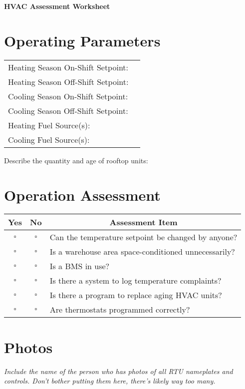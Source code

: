 \documentclass[./main.tex]{subfiles}
\begin{document}
\begin{center}
\Large\textbf{HVAC Assessment Worksheet}
\end{center}

\section*{Operating Parameters}
\noindent\begin{tabularx}{\textwidth}{@{}lX@{}}
Heating Season On-Shift Setpoint:  & \hrulefill \\[2ex]
Heating Season Off-Shift Setpoint: & \hrulefill \\[2ex]
Cooling Season On-Shift Setpoint:  & \hrulefill \\[2ex]
Cooling Season Off-Shift Setpoint: & \hrulefill \\[2ex]
Heating Fuel Source(s): & \hrulefill \\[2ex]
Cooling Fuel Source(s): & \hrulefill \\[2ex]
\end{tabularx}

\noindent Describe the quantity and age of rooftop units:  \vspace{\answerspace}

\section*{Operation Assessment}

\begin{tabular}{|c|c|p{14cm}|}
\hline
\multicolumn{1}{|c|}{\textbf{Yes}} & \multicolumn{1}{c|}{\textbf{No}} & \multicolumn{1}{c|}{\textbf{Assessment Item}} \\
\hline
$\square$ & $\square$ & Can the temperature setpoint be changed by anyone?  \\
\hline
$\square$ & $\square$ & Is a warehouse area space-conditioned unnecessarily?  \\
\hline
$\square$ & $\square$ & Is a BMS in use?  \\
\hline
$\square$ & $\square$ & Is there a system to log temperature complaints?  \\
\hline
$\square$ & $\square$ & Is there a program to replace aging HVAC units?  \\
\hline
$\square$ & $\square$ & Are thermostats programmed correctly?  \\
\hline
\end{tabular}

\section*{Photos}
\emph{Include the name of the person who has photos of all RTU nameplates and controls. Don't bother putting them here, there's likely way too many.  }
\end{document}
